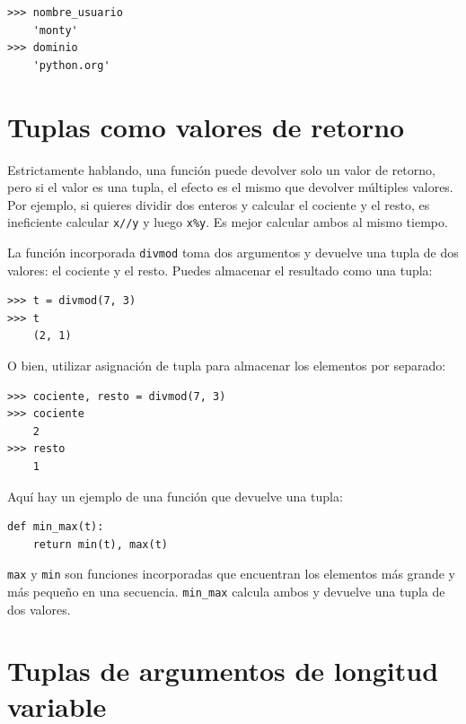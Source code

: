\documentclass[10pt]{book}
\begin{document}
\begin{verbatim}
>>> nombre_usuario
    'monty'
>>> dominio
    'python.org'
\end{verbatim}
%

\section{Tuplas como valores de retorno}

Estrictamente hablando, una función puede devolver solo un valor de retorno, pero
si el valor es una tupla, el efecto es el mismo que devolver
múltiples valores.  Por ejemplo, si quieres dividir dos enteros
y calcular el cociente y el resto, es ineficiente
calcular {\tt x//y} y luego {\tt x\%y}.  Es mejor calcular
ambos al mismo tiempo.

La función incorporada {\tt divmod} toma dos argumentos y
devuelve una tupla de dos valores: el cociente y el resto.
Puedes almacenar el resultado como una tupla:

\begin{verbatim}
>>> t = divmod(7, 3)
>>> t
    (2, 1)
\end{verbatim}
%
O bien, utilizar asignación de tupla para almacenar los elementos por separado:

\begin{verbatim}
>>> cociente, resto = divmod(7, 3)
>>> cociente
    2
>>> resto
    1
\end{verbatim}
%
Aquí hay un ejemplo de una función que devuelve una tupla:

\begin{verbatim}
def min_max(t):
    return min(t), max(t)
\end{verbatim}
%
{\tt max} y {\tt min} son funciones incorporadas que encuentran
los elementos más grande y más pequeño en una secuencia.  \verb"min_max"
calcula ambos y devuelve una tupla de dos valores.


\section{Tuplas de argumentos de longitud variable}
\label{gather}
\end{document}
